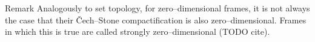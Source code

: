 \begin{block}{Remark}
    Analogously to set topology, for zero--dimensional frames, it is not always the case that their Čech--Stone compactification is also zero--dimensional. Frames in which this is true are called strongly zero--dimensional (TODO cite).
\end{block}



